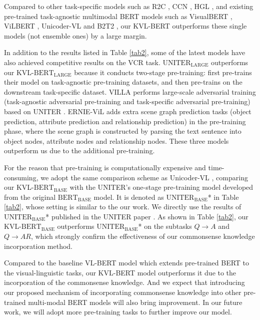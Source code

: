 \documentclass[conference]{IEEEtran}
\begin{document}
Compared to other task-specific models such as R2C \cite{b10}, CCN \cite{b17}, HGL \cite{b18}, and existing pre-trained task-agnostic multimodal BERT models such as VisualBERT \cite{b12}, ViLBERT \cite{b13}, Unicoder-VL \cite{b19} and B2T2 \cite{b15}, our KVL-BERT outperforms these single models (not ensemble ones) by a large margin. 

In addition to the results listed in Table \ref{tab2}, some of the latest models have also achieved competitive results on the VCR task. $\mathrm{UNITER}_{\mathrm{LARGE}}$ \cite{b20} outperforms our KVL-$\mathrm{BERT}_{\mathrm{LARGE}}$ because it conducts two-stage pre-training: first pre-trains their model on task-agnostic pre-training datasets, and then pre-trains on the downstream task-specific dataset. VILLA \cite{gan2020large} performs large-scale adversarial training (task-agnostic adversarial pre-training and task-specific adversarial pre-training) based on UNITER \cite{b20}. ERNIE-ViL \cite{yu2020ernie} adds extra scene graph prediction tasks (object prediction, attribute prediction and relationship prediction) in the pre-training phase, where the scene graph is constructed by parsing the text sentence into object nodes, attribute nodes and relationship nodes. These three models outperform us due to the additional pre-training.






For the reason that pre-training is computationally expensive and time-consuming, we adopt the same comparison scheme as Unicoder-VL \cite{b19}, comparing our KVL-$\mathrm{BERT}_{\mathrm{BASE}}$ with the UNITER's one-stage pre-training model developed from the original $\mathrm{BERT}_{\mathrm{BASE}}$ model. It is denoted as $\mathrm{UNITER}_{\mathrm{BASE}}$* in Table \ref{tab2}, whose setting is similar to the our work. We directly use the results of $\mathrm{UNITER}_{\mathrm{BASE}}$* published in the UNITER paper \cite{b20}. As shown in Table \ref{tab2}, our KVL-$\mathrm{BERT}_{\mathrm{BASE}}$ outperforms $\mathrm{UNITER}_{\mathrm{BASE}}$* on the subtasks $Q \rightarrow A$ and $Q \rightarrow AR$, which strongly confirm the effectiveness of our commonsense knowledge incorporation method. 

Compared to the baseline VL-BERT model which extends pre-trained BERT to the visual-linguistic tasks, our KVL-BERT model outperforms it due to the incorporation of the commonsense knowledge. And we expect that introducing our proposed mechanism of incorporating commonsense knowledge into other pre-trained multi-modal BERT models will also bring improvement. In our future work, we will adopt more pre-training tasks to further improve our model.
 
\end{document}
